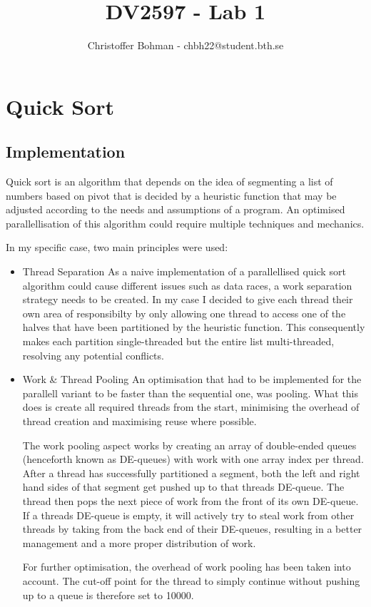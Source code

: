 \documentclass[a4]{article}
\title{DV2597 - Lab 1}
\author{Christoffer Bohman - chbh22@student.bth.se}
\begin{document}
\maketitle

\newpage

\section{Quick Sort}

\subsection{Implementation}

Quick sort is an algorithm that depends on the idea of segmenting a list of numbers based on
pivot that is decided by a heuristic function that may be adjusted according to the needs and
assumptions of a program. An optimised parallellisation of this algorithm could require multiple 
techniques and mechanics.

In my specific case, two main principles were used:

\begin{itemize}
    \item Thread Separation
    \subitem{\textbf{-}} As a naive implementation of a parallellised quick sort algorithm could 
    cause different issues such as data races, a work separation strategy needs to be created. In
    my case I decided to give each thread their own area of responsibilty by only allowing one thread
    to access one of the halves that have been partitioned by the heuristic function. This consequently
    makes each partition single-threaded but the entire list multi-threaded, resolving any potential
    conflicts.

    \item Work \& Thread Pooling
    \subitem{\textbf{-}} An optimisation that had to be implemented for the parallell variant to be 
    faster than the sequential one, was pooling. What this does is create all required threads from the
    start, minimising the overhead of thread creation and maximising reuse where possible. 
    
    The work pooling aspect works by creating an array of double-ended queues (henceforth known as DE-queues) 
    with work with one array index per thread. After a thread has successfully partitioned a segment, both 
    the left and right hand sides of that segment get pushed up to that threads DE-queue. The thread then pops
    the next piece of work from the front of its own DE-queue. If a threads DE-queue is empty, it will actively
    try to steal work from other threads by taking from the back end of their DE-queues, resulting in a better 
    management and a more proper distribution of work.

    For further optimisation, the overhead of work pooling has been taken into account. The cut-off point for 
    the thread to simply continue without pushing up to a queue is therefore set to 10000.
\end{itemize}
\end{document}
